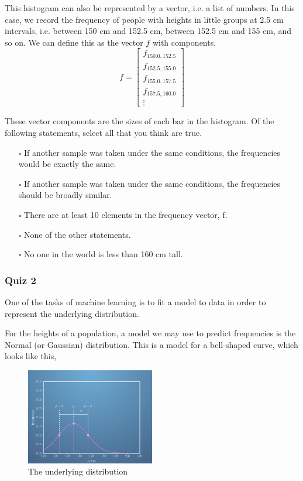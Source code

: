\documentclass[]{article}
\begin{document}
This histogram can also be represented by a vector, i.e. a list of numbers. In this case, we record the frequency of people with heights in little groups at 2.5 cm intervals, i.e. between 150 cm and 152.5 cm, between 152.5 cm and 155 cm, and so on. We can define this as the vector $ f $ with components,
\begin{equation} \label{f_vector}
	f =
	\begin{bmatrix}
		f_{150.0, 152.5} \\
		f_{152.5, 155.0} \\
		f_{155.0, 157.5} \\
		f_{157.5, 160.0} \\
		\vdots
	\end{bmatrix}
\end{equation}

These vector components are the sizes of each bar in the histogram. Of the following statements, select all that you think are true.

\begin{itemize}
	\item[$\square$] If another sample was taken under the same conditions, the frequencies would be exactly the same.
	\item[$\square$] If another sample was taken under the same conditions, the frequencies should be broadly similar.
	\item[$\square$] There are at least 10 elements in the frequency vector, f.
	\item[$\square$] None of the other statements.
	\item[$\square$] No one in the world is less than 160 cm tall. 
\end{itemize}

\subsubsection{Quiz 2}

One of the tasks of machine learning is to fit a model to data in order to represent the underlying distribution.

For the heights of a population, a model we may use to predict frequencies is the Normal (or Gaussian) distribution. This is a model for a bell-shaped curve, which looks like this,

\begin{figure}[h]
	\centering
	\includegraphics[width=0.5\textwidth]{underlying_dist}
	\caption{The underlying distribution}
	\label{fig:underlying_dist}
\end{figure}
\end{document}
